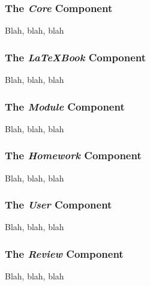 	\subsubsection{The \textit{Core} Component}
		Blah, blah, blah
	
	\subsubsection{The \textit{LaTeXBook} Component}
		Blah, blah, blah
	
	\subsubsection{The \textit{Module} Component}
		Blah, blah, blah
	
	\subsubsection{The \textit{Homework} Component}
		Blah, blah, blah
		
	\subsubsection{The \textit{User} Component}
		Blah, blah, blah
	
	\subsubsection{The \textit{Review} Component}
		Blah, blah, blah
